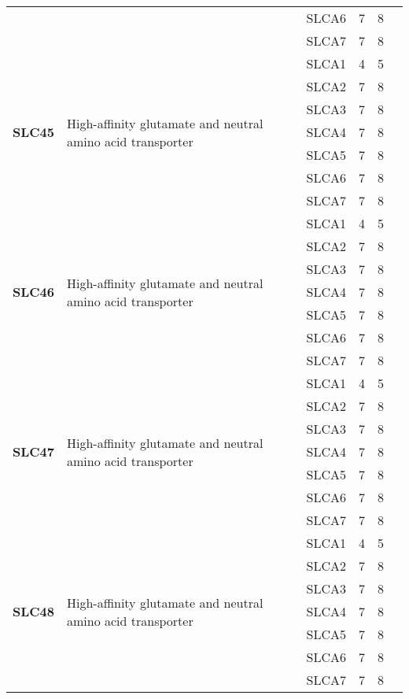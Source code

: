 \documentclass[12pt]{report}
\begin{document}
\begin{center}
\begin{longtable}{|p{1.5cm}|p{3.2cm}|p{1.9cm}|p{1.65cm}|p{3cm}|p{3cm}|}
\cline{3-6}
&&SLCA6&7 & 8&\\ 
\cline{3-6}
&&SLCA7&7 & 8&\\ 
\hline
\multirow{7}{1.5cm}{\textbf{SLC45}} & \multirow{7}{4cm}{High-affinity glutamate and neutral amino acid transporter} & SLCA1 & 4 & 5\\ 
\cline{3-6}
&&SLCA2&7 & 8&\\ 
\cline{3-6}
&&SLCA3&7 & 8&\\ 
\cline{3-6}
&&SLCA4&7 & 8&\\ 
\cline{3-6}
&&SLCA5&7 & 8&\\ 
\cline{3-6}
&&SLCA6&7 & 8&\\ 
\cline{3-6}
&&SLCA7&7 & 8&\\ 
\hline
\multirow{7}{1.5cm}{\textbf{SLC46}} & \multirow{7}{4cm}{High-affinity glutamate and neutral amino acid transporter} & SLCA1 & 4 & 5\\ 
\cline{3-6}
&&SLCA2&7 & 8&\\ 
\cline{3-6}
&&SLCA3&7 & 8&\\ 
\cline{3-6}
&&SLCA4&7 & 8&\\ 
\cline{3-6}
&&SLCA5&7 & 8&\\ 
\cline{3-6}
&&SLCA6&7 & 8&\\ 
\cline{3-6}
&&SLCA7&7 & 8&\\ 
\hline
\multirow{7}{1.5cm}{\textbf{SLC47}} & \multirow{7}{4cm}{High-affinity glutamate and neutral amino acid transporter} & SLCA1 & 4 & 5\\ 
\cline{3-6}
&&SLCA2&7 & 8&\\ 
\cline{3-6}
&&SLCA3&7 & 8&\\ 
\cline{3-6}
&&SLCA4&7 & 8&\\ 
\cline{3-6}
&&SLCA5&7 & 8&\\ 
\cline{3-6}
&&SLCA6&7 & 8&\\ 
\cline{3-6}
&&SLCA7&7 & 8&\\ 
\hline
\multirow{7}{1.5cm}{\textbf{SLC48}} & \multirow{7}{4cm}{High-affinity glutamate and neutral amino acid transporter} & SLCA1 & 4 & 5\\ 
\cline{3-6}
&&SLCA2&7 & 8&\\ 
\cline{3-6}
&&SLCA3&7 & 8&\\ 
\cline{3-6}
&&SLCA4&7 & 8&\\ 
\cline{3-6}
&&SLCA5&7 & 8&\\ 
\cline{3-6}
&&SLCA6&7 & 8&\\ 
\cline{3-6}
&&SLCA7&7 & 8&\\ 

\end{longtable}
\end{center}
\end{document}
